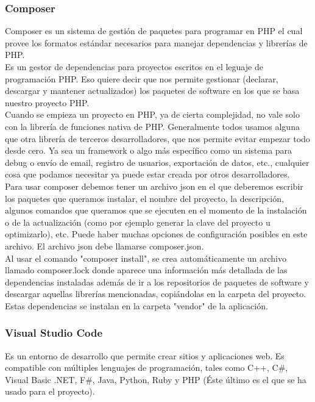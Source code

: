 \subsubsection{Composer}
Composer es un sistema de gestión de paquetes para programar en PHP el cual provee los formatos estándar necesarios para manejar dependencias y librerías de PHP. \cite{Composer:definicion}\\
Es un gestor de dependencias para proyectos escritos en el leguaje de programación PHP. Eso quiere decir que nos permite gestionar (declarar, descargar y mantener actualizados) los paquetes de software en los que se basa nuestro proyecto PHP.\\
Cuando se empieza un proyecto en PHP, ya de cierta complejidad, no  vale solo con la librería de funciones nativa de PHP. Generalmente todos usamos alguna que otra librería de terceros desarrolladores, que nos permite evitar empezar todo desde cero. Ya sea un framework o algo más específico como un sistema para debug o envío de email, registro de usuarios, exportación de datos, etc., cualquier cosa que podamos necesitar ya puede estar creada por otros desarrolladores.\\
Para usar composer debemos tener un archivo json en el que deberemos escribir los paquetes que queramos instalar, el nombre del proyecto, la descripción, algunos comandos que queramos que se ejecuten en el momento de la instalación o de la actualización (como por ejemplo generar la clave del proyecto u optimizarlo), etc. Puede haber muchas opciones de configuración posibles en este archivo. 
El archivo json debe llamarse composer.json.\\
Al usar el comando "composer install", se crea automáticamente un archivo llamado composer.lock donde aparece una información más detallada de las dependencias instaladas además de ir a los repositorios de paquetes de software y descargar aquellas librerías mencionadas, copiándolas en la carpeta del proyecto.\\
Estas dependencias se instalan en la carpeta "vendor" de la aplicación.\cite{composer}
\subsubsection{Visual Studio Code}
Es un entorno de desarrollo que permite crear sitios y aplicaciones web. Es compatible con múltiples lenguajes de programación, tales como C++, C\#, Visual Basic .NET, F\#, Java, Python, Ruby y PHP (Éste último es el que se ha usado para el proyecto).\cite{VisualStudio} 
